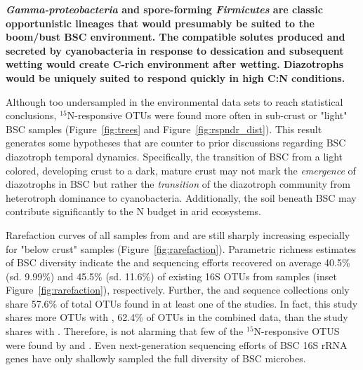 \textbf{\textit{Gamma-proteobacteria} and spore-forming \textit{Firmicutes} are classic
opportunistic lineages that would presumably be suited to the boom/bust BSC
environment. The compatible solutes produced and secreted by cyanobacteria in
response to dessication and subsequent wetting would create C-rich
environment after wetting. Diazotrophs would be uniquely suited to respond
quickly in high C:N conditions.} 

Although too undersampled in the environmental data sets to reach statistical
conclusions, $^{15}$N-responsive OTUs were found more often in sub-crust or
"light" BSC samples (Figure~\ref{fig:trees} and Figure~\ref{fig:rspndr_dist}).
This result generates some hypotheses that are counter to prior discussions
regarding BSC diazotroph temporal dynamics. Specifically, the transition of BSC
from a light colored, developing crust to a dark, mature crust may not mark the
\textit{emergence} of diazotrophs in BSC but rather the \textit{transition} of
the diazotroph community from heterotroph dominance to cyanobacteria.
Additionally, the soil beneath BSC may contribute significantly to the N budget
in arid ecosystems.

Rarefaction curves of all samples from \citet{Steven_2013} and
\citet{Garcia_Pichel_2013} are still sharply increasing especially for "below
crust" samples (Figure~\ref{fig:rarefaction}). Parametric richness estimates of
BSC diversity indicate the \citet{Steven_2013} and \citet{Garcia_Pichel_2013}
sequencing efforts recovered on average 40.5\% (sd. 9.99\%) and 45.5\% (sd.
11.6\%) of existing 16S OTUs from samples (inset Figure~\ref{fig:rarefaction}),
respectively. Further, the \citet{Steven_2013} and \citet{Garcia_Pichel_2013}
sequence collections only share 57.6\% of total OTUs found in at least one of
the studies. In fact, this study shares more OTUs with \citet{Steven_2013},
62.4\% of OTUs in the combined data, than the \citet{Steven_2013} study shares
with \citet{Garcia_Pichel_2013}.  Therefore, is not alarming that few of the
$^{15}$N-responsive OTUS were found by \citet{Garcia_Pichel_2013} and
\citet{Steven_2013}. Even next-generation sequencing efforts of BSC 16S rRNA
genes have only shallowly sampled the full diversity of BSC microbes.  

